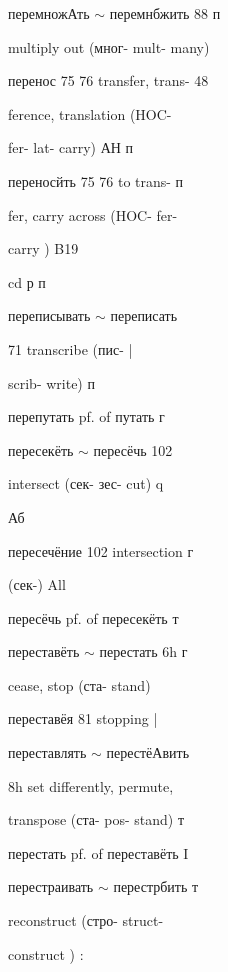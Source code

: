 \clearpage
\thispagestyle{plain}
\begingroup
\cyrillicfont
\fontsize{7.25}{8.25}\selectfont
\setlength{\parindent}{0pt}
\setlength{\parskip}{0pt}
\setlength{\emergencystretch}{1.5em}
\noindent
\begin{minipage}[t]{0.475\textwidth}
\raggedright
\noindent перемножАть $\sim$ перемнбжить 88 п\par
\noindent multiply out (мног- mult- many)\par
\noindent перенос 75 76 transfer, trans- 48\par
\noindent ference, translation (HOC-\par
\noindent fer- lat- carry) АН п\par
\noindent переносйть 75 76 to trans- п\par
\noindent fer, carry across (HOC- fer-\par
\noindent carry ) B19\par
\noindent cd р п\par
\noindent переписывать $\sim$ переписать\par
{} 71 transcribe (пис- |\par
\noindent scrib- write) п\par
\noindent перепутать pf. of путать г\par
\noindent пересекёть $\sim$ пересёчь 102\par
\noindent intersect (сек- зес- cut) q\par
\noindent Аб\par
\noindent пересечёние 102 intersection г\par
\noindent (сек-) All\par
\noindent пересёчь pf. of пересекёть т\par
\noindent переставёть $\sim$ перестать 6h г\par
\noindent cease, stop (ста- stand)\par
\noindent переставёя 81 stopping |\par
\noindent переставлять $\sim$ перестёАвить\par
\noindent 8h set differently, permute,\par
\noindent transpose (ста- pos- stand) т\par
\noindent перестать pf. of переставёть I\par
\noindent перестраивать $\sim$ перестрбить т\par
{} reconstruct (стро- struct-\par
\noindent construct ) :\par

\end{minipage}
